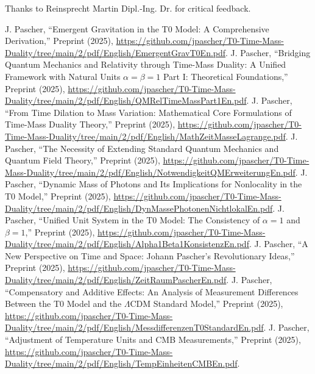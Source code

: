 \documentclass[twocolumn,aps,prl]{revtex4-2}
\begin{document}
	\begin{acknowledgments}
		Thanks to Reinsprecht Martin Dipl.-Ing. Dr. for critical feedback.
	\end{acknowledgments}
	
	\begin{thebibliography}{99}
		 J. Pascher, ``Emergent Gravitation in the T0 Model: A Comprehensive Derivation,'' Preprint (2025), \url{https://github.com/jpascher/T0-Time-Mass-Duality/tree/main/2/pdf/English/EmergentGravT0En.pdf}.
		 J. Pascher, ``Bridging Quantum Mechanics and Relativity through Time-Mass Duality: A Unified Framework with Natural Units $\alpha = \beta = 1$ Part I: Theoretical Foundations,'' Preprint (2025), \url{https://github.com/jpascher/T0-Time-Mass-Duality/tree/main/2/pdf/English/QMRelTimeMassPart1En.pdf}.
		 J. Pascher, ``From Time Dilation to Mass Variation: Mathematical Core Formulations of Time-Mass Duality Theory,'' Preprint (2025), \url{https://github.com/jpascher/T0-Time-Mass-Duality/tree/main/2/pdf/English/MathZeitMasseLagrange.pdf}.
		 J. Pascher, ``The Necessity of Extending Standard Quantum Mechanics and Quantum Field Theory,'' Preprint (2025), \url{https://github.com/jpascher/T0-Time-Mass-Duality/tree/main/2/pdf/English/NotwendigkeitQMErweiterungEn.pdf}.
		 J. Pascher, ``Dynamic Mass of Photons and Its Implications for Nonlocality in the T0 Model,'' Preprint (2025), \url{https://github.com/jpascher/T0-Time-Mass-Duality/tree/main/2/pdf/English/DynMassePhotonenNichtlokalEn.pdf}.
		 J. Pascher, ``Unified Unit System in the T0 Model: The Consistency of $\alpha = 1$ and $\beta = 1$,'' Preprint (2025), \url{https://github.com/jpascher/T0-Time-Mass-Duality/tree/main/2/pdf/English/Alpha1Beta1KonsistenzEn.pdf}.
		 J. Pascher, ``A New Perspective on Time and Space: Johann Pascher's Revolutionary Ideas,'' Preprint (2025), \url{https://github.com/jpascher/T0-Time-Mass-Duality/tree/main/2/pdf/English/ZeitRaumPascherEn.pdf}.
		 J. Pascher, ``Compensatory and Additive Effects: An Analysis of Measurement Differences Between the T0 Model and the $\Lambda$CDM Standard Model,'' Preprint (2025), \url{https://github.com/jpascher/T0-Time-Mass-Duality/tree/main/2/pdf/English/MessdifferenzenT0StandardEn.pdf}.
		 J. Pascher, ``Adjustment of Temperature Units and CMB Measurements,'' Preprint (2025), \url{https://github.com/jpascher/T0-Time-Mass-Duality/tree/main/2/pdf/English/TempEinheitenCMBEn.pdf}.

\end{thebibliography}
\end{document}
